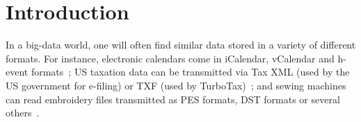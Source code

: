 \documentclass[acmsmall,screen,anonymous]{acmart}
\begin{document}

\ifanon
\maketitle
\else
\author{Anders Miltner}

\author{Solomon Maina}

\author{Kathleen Fisher}

\author{Benjamin C. Pierce}

\author{David Walker}

\author{Steve Zdancewic}


\maketitle
\fi

\ifanon\else
\fi

\section{Introduction}

\noindent
In a big-data world, one will often find similar data stored in a variety of
different formats. For instance, electronic calendars come in iCalendar,
vCalendar and h-event formats~\cite{calendar-formats}; US taxation data can be
transmitted via Tax XML (used by the US government for e-filing) or TXF (used by
TurboTax)~\cite{tax-formats}; and sewing machines can read embroidery files
transmitted as PES formats, DST formats or several
others~\cite{embroidery-formats}.
\end{document}
